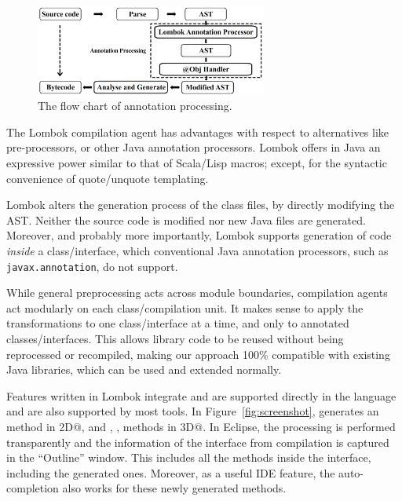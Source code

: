 
\begin{figure}[t]
\saveSpaceFig
\centering
\includegraphics[width=3in]{pdfs/lombok3.png}
\caption{The flow chart of \mixin annotation processing.
}
\label{fig:lombok}
\saveSpaceFig
\end{figure}

The Lombok compilation agent has advantages with respect to alternatives like
pre-processors, or other Java annotation processors.
Lombok offers in Java an expressive power similar to that of Scala/Lisp macros;
except, for the syntactic convenience of quote/unquote templating.

Lombok alters the generation process of the class files,
by directly modifying the AST. Neither the source code is modified nor
new Java files are generated. Moreover, and probably more importantly,
Lombok supports generation of code \emph{inside} a class/interface,
which conventional Java annotation processors, such as \texttt{javax.annotation}, do not support.

While general preprocessing acts across module boundaries, compilation
agents act modularly on each class/compilation unit. It makes sense to
apply the transformations to one class/interface at a time, and only to
annotated classes/interfaces. This allows library code to be reused
without being reprocessed or recompiled, making our
approach 100\% compatible with existing Java libraries, which can be
used and extended normally.

Features written in Lombok integrate and are supported directly in the
language and are also supported by most tools.
In Figure~\ref{fig:screenshot},
\mixin generates an \Q@of@ method in \Q@Point2D@, and \Q@of@, \Q@withX@, \Q@withY@ methods in \Q@Point3D@.
In Eclipse, the processing is
performed transparently and the information of the interface from
compilation is captured in the ``Outline'' window.
This includes all
the methods inside the interface, including the generated ones.
Moreover, as a useful IDE feature, the auto-completion also works for these newly generated methods.

